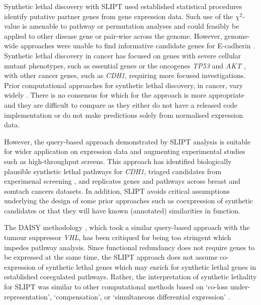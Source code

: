 Synthetic lethal discovery  with \gls{SLIPT} used established statistical procedures identify putative partner genes from gene expression data. Such use of the $\chi^2$-value is amenable to pathway or permutation analyses and could feasibly be applied to other disease gene or pair-wise across the genome. However, genome-wide approaches were unable to find informative candidate genes for E-cadherin \cite{Lu2015}. Synthetic lethal discovery in cancer has focused on genes with severe cellular mutant phenotypes, such as essential genes or the oncogenes \textit{TP53} and \textit{AKT} \cite{Tiong2014, Lu2015, Wang2013}, with other cancer genes, such as \textit{CDH1}, requiring more focused investigations. Prior computational approaches for synthetic lethal discovery, in cancer, vary widely \citep{Tiong2014, Jerby2014, Lu2015, Wappett2016}. There is no consensus for which for the approach is more appropriate and they are difficult to compare as they either do not have a released code implementation or do not make predictions solely from normalised expression data.

However, the query-based approach demonstrated by \gls{SLIPT} analysis is suitable for wider application on expression data and augmenting experimental studies such as high-throughput screens. This approach has identified biologically plausible synthetic lethal pathways for \textit{CDH1}, triaged candidates from experimenal screening \citep{Telford2015}, and replicates genes and pathways across breast and somtach cancers datasets. In addition, \gls{SLIPT} avoids critical assumptions underlying the design of some prior approaches such as coexpression of synthetic candidates or that they will have known (annotated) similarities in function.

The DAISY methodology \cite{Jerby2014}, which took a similar query-based approach with the tumour suppressor \textit{VHL}, has been critiqued for being too stringent \cite{Lu2015} which impedes pathway analysis. Since functional redundancy does not require genes to be expressed at the same time, the \gls{SLIPT} approach does not assume co-expression of synthetic lethal genes which may enrich for synthetic lethal genes in established coregulated pathways. Rather, the interpretation of synthetic lethality for \gls{SLIPT} was similar to other computational methods based on `co-loss under-represent\-at\-ion', `compensation', or `simultaneous differential expression' \cite{Tiong2014, Lu2015, Wang2013}.

